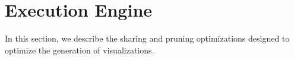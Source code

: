 
\section{{\large \SeeDB} Execution Engine}
\label{sec:optimizer}

In this section, we describe the sharing and pruning optimizations designed
to optimize the generation of visualizations.



